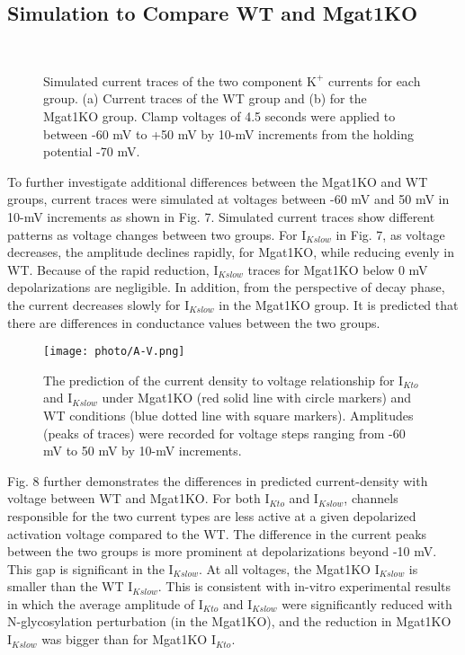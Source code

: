 \documentclass[journal]{IEEEtran}
\begin{document}
\subsection{Simulation to Compare WT and Mgat1KO}
\begin{figure}
    \label{fig 7}
    \centering
    \\
    \caption{Simulated current traces of the two component $\text{K}^{+}$ currents for each group. (a) Current traces of the WT group and (b) for the Mgat1KO group. Clamp voltages of 4.5 seconds were applied to between -60 mV to +50 mV by 10-mV increments from the holding potential -70 mV.}
\end{figure}
To further investigate additional differences between the Mgat1KO and WT groups, current traces were simulated at voltages between -60 mV and 50 mV in 10-mV increments as shown in Fig. 7. Simulated current traces show different patterns as voltage changes between two groups. For $\text{I}_{Kslow}$ in Fig. 7, as voltage decreases, the amplitude declines rapidly, for Mgat1KO, while reducing evenly in WT. Because of the rapid reduction, $\text{I}_{Kslow}$ traces for Mgat1KO below 0 mV depolarizations are negligible. In addition, from the perspective of decay phase, the current decreases slowly for $\text{I}_{Kslow}$ in the Mgat1KO group. It is predicted that there are differences in conductance values between the two groups.

\begin{figure}
    \label{fig 8}
    \centering
    \texttt{[image: photo/A-V.png]}
    \caption{The prediction of the current density to voltage relationship for $\text{I}_{Kto}$ and $\text{I}_{Kslow}$ under Mgat1KO (red solid line with circle markers) and WT conditions (blue dotted line with square markers). Amplitudes (peaks of traces) were recorded for voltage steps ranging from -60 mV to 50 mV by 10-mV increments.} 
\end{figure}
Fig. 8 further demonstrates the differences in predicted current-density with voltage between WT and Mgat1KO. For both $\text{I}_{Kto}$ and $\text{I}_{Kslow}$, channels responsible for the two current types are less  active at a given depolarized activation voltage compared to the WT. The difference in the current peaks between the two groups is more prominent at depolarizations beyond -10 mV. This gap is significant in the $\text{I}_{Kslow}$. At all voltages, the Mgat1KO $\text{I}_{Kslow}$ is smaller than the WT $\text{I}_{Kslow}$. This is consistent with in-vitro experimental results in which the average amplitude of $\text{I}_{Kto}$ and $\text{I}_{Kslow}$ were significantly reduced with N-glycosylation perturbation (in the Mgat1KO), and the reduction in Mgat1KO $\text{I}_{Kslow}$ was bigger than for Mgat1KO $\text{I}_{Kto}$. 
\end{document}
